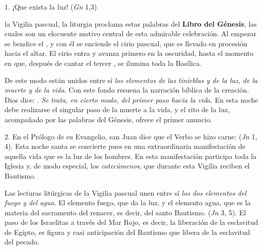 
\begin{body}
1. ¡Que exista la luz! (\textit{Gn} 1,3)

 la Vigilia pascual, la liturgia proclama estas palabras del \textbf{Libro del Génesis}, las cuales son un elocuente motivo central de esta admirable celebración. Al empezar se bendice el , y con él se enciende el cirio pascual, que es llevado en procesión hacia el altar. El cirio entra y avanza primero en la oscuridad, hasta el momento en que, después de cantar el tercer , se ilumina toda la Basílica.

De este modo están unidos entre sí \textit{los elementos de las tinieblas y de la luz, de la muerte y de la vida}. Con este fondo resuena la narración bíblica de la creación. Dios dice: . \textit{Se trata, en cierto modo, del primer paso hacia la vid}a. En esta noche debe realizarse el singular paso de la muerte a la vida, y el rito de la luz, acompañado por las palabras del Génesis, ofrece el primer anuncio.

2. En el Prólogo de su Evangelio, san Juan dice que el Verbo se hizo carne:  (\textit{Jn} 1, 4). Esta noche santa se convierte pues en una extraordinaria manifestación de aquella vida que es la luz de los hombres. En esta manifestación participa toda la Iglesia y, de modo especial, los \textit{catecúmenos}, que durante esta Vigilia reciben el Bautismo.


Las lecturas litúrgicas de la Vigilia pascual unen entre sí \textit{los dos elementos del fuego y del agua}. El elemento fuego, que da la luz, y el elemento agua, que es la materia del sacramento del renacer, es decir, del santo Bautismo.  (\textit{Jn} 3, 5). El paso de los Israelitas a través del Mar Rojo, es decir, la liberación de la esclavitud de Egipto, es figura y casi anticipación del Bautismo que libera de la esclavitud del pecado.


\end{body}
